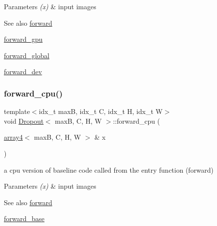 \begin{DoxyParams}{Parameters}
{\em (x)} & input images \\
\hline
\end{DoxyParams}
\begin{DoxySeeAlso}{See also}
\hyperlink{structDropout_a155eb3ad77df591bdd95645fec1f2089}{forward} 

\hyperlink{structDropout_a3bb7569a99e88c36e508bee45f379fad}{forward\+\_\+gpu} 

\hyperlink{softmaxcrossentropy_8h_a578aeeb166bd06e800d9b396eab48b35}{forward\+\_\+global} 

\hyperlink{structDropout_a81ee0268c4195380873af8ced5b1acc7}{forward\+\_\+dev} 
\end{DoxySeeAlso}
\mbox{\label{structDropout_a2adc263cee9f2d84a8d0729ffaf924a6}} 
\subsubsection{\texorpdfstring{forward\+\_\+cpu()}{forward\_cpu()}}
{\footnotesize\ttfamily template$<$idx\+\_\+t maxB, idx\+\_\+t C, idx\+\_\+t H, idx\+\_\+t W$>$ \\
void \hyperlink{structDropout}{Dropout}$<$ maxB, C, H, W $>$\+::forward\+\_\+cpu (\begin{DoxyParamCaption}\item[{\hyperlink{structarray4}{array4}$<$ maxB, C, H, W $>$ \&}]{x }\end{DoxyParamCaption})\hspace{0.3cm}{\ttfamily [inline]}}



a cpu version of baseline code called from the entry function (forward) 


\begin{DoxyParams}{Parameters}
{\em (x)} & input images \\
\hline
\end{DoxyParams}
\begin{DoxySeeAlso}{See also}
\hyperlink{structDropout_a155eb3ad77df591bdd95645fec1f2089}{forward} 

\hyperlink{structDropout_a8d7db70a48a4c2e3887c931b099f1160}{forward\+\_\+base} 
\end{DoxySeeAlso}
\mbox{\label{structDropout_a81ee0268c4195380873af8ced5b1acc7}} 
